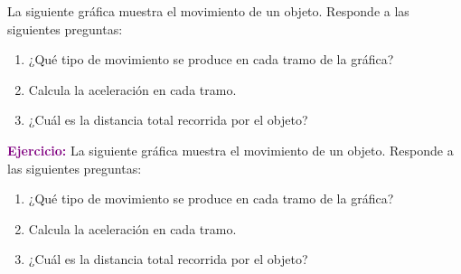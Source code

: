 \begin{exercise}
    La siguiente gráfica muestra el movimiento de un objeto. Responde a las siguientes preguntas:
    \begin{enumerate}[label=\letraminuscula]
    \item ¿Qué tipo de movimiento se produce en cada tramo de la gráfica?
    \item Calcula la aceleración en cada tramo.
    \item ¿Cuál es la distancia total recorrida por el objeto?
    \end{enumerate}

    \begin{figure}[H]
        \centering
    \end{figure}

    \begin{solu}
        \textbf{\textcolor{purple}{Ejercicio:}} La siguiente gráfica muestra el movimiento de un objeto. Responde a las siguientes preguntas:
        \begin{enumerate}[label=\letraminuscula]
            \item ¿Qué tipo de movimiento se produce en cada tramo de la gráfica?
            \item Calcula la aceleración en cada tramo.
            \item ¿Cuál es la distancia total recorrida por el objeto?
        \end{enumerate}


\end{solu}
\end{exercise}
